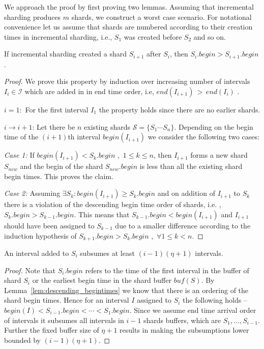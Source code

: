 We approach the proof by first proving two lemmas.
Assuming that incremental sharding produces $m$ shards, we construct a worst case scenario. For notational convenience let us assume that shards are numbered according to their creation times in incremental sharding, i.e., $S_1$ was created before $S_2$ and so on. 

\begin{lemma}
\label{lem:descending_begintimes}
If incremental sharding created a shard $S_{i+1}$ after $S_i$, then \linebreak $S_i.begin > S_{i+1}.begin$.
\end{lemma}
\begin{proof}
We prove this property by induction over increasing number of intervals $I_i \in \mathcal{I}$ which are added in in end time order, i.e, $end(I_{i+1}) \, > \, end(I_{i})$ .

$i = 1:$ For the first interval $I_1$ the property holds since there are no earlier shards.

$i \rightarrow i+1$: Let there be $n$ existing shards $\mathcal{S} = \{ S_1 \cdots S_n \}$. Depending on the begin time of the $(i+1)$th interval $begin(I_{i+1})$ we consider the following two cases:

\emph{Case 1:} If $begin(I_{i+1}) < S_k.begin \,\, , \,\, 1 \le k \le n$, then $I_{i+1}$ forms a new shard $S_{new}$ and the begin of the shard $S_{new}.begin$ is less than all the existing shard begin times. This proves the claim.

\emph{Case 2:} Assuming $\exists S_k : begin(I_{i+1}) \geq S_k.begin$ and on addition of $I_{i+1}$ to $S_k$ there is a violation of the descending begin time order of shards, i.e. , $S_k.begin > S_{k-1}.begin$. This means that $S_{k-1}.begin < begin(I_{i+1})$ and $I_{i+1}$ should have been assigned to $S_{k-1}$ due to a smaller difference according to the induction hypothesis of $S_{k+1}.begin > S_{k}.begin\,\,, \,\,\forall 1 \le k < n$.
\end{proof}

\begin{lemma}
\label{lem:incremental_subsumption}
	An interval \linebreak added to $S_i$ subsumes at least $(i-1)(\eta + 1)$ intervals.
\end{lemma}


\begin{proof}
Note that $S_i.begin$ refers to the time of the first interval in the buffer of shard $S_i$ or the earliest begin time in the shard buffer $bu\!f(S)$. 
By Lemma~\ref{lem:descending_begintimes} we know that there is an ordering of the shard begin times. Hence for an interval $I$ assigned to $S_i$ the following holds -- $begin(I) < S_{i-1}.begin < \cdots < S_1.begin$. Since we assume end time arrival order of intervals it subsumes all intervals in $i-1$ shards buffers, which are $S_1,...,S_{i-1}$. Further the fixed buffer size of $\eta+1$ results in making the subsumptions lower bounded by  $(i-1)(\eta + 1)$.\end{proof}

